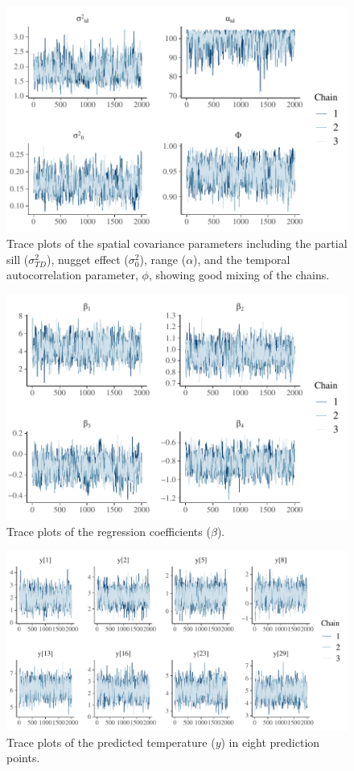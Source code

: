 \begin{figure}[htbp]
  \centering
   \includegraphics[width=5.0in]{./Figs/9traceplot_pars.pdf}
  \caption{Trace plots of the spatial covariance parameters including the partial sill ($\sigma^2_{TD}$), nugget effect ($\sigma^2_{0}$), range ($\alpha$), and the temporal autocorrelation parameter, $\phi$, showing good mixing of the chains. }
  \label{figure:3trace_pars}
\end{figure}



\begin{figure}[htbp]
  \centering
   \includegraphics[width=5.0in]{./Figs/9traceplot_beta.pdf}
  \caption{Trace plots of the regression coefficients ($\beta$). }
  \label{figure:3trace_beta}
\end{figure}


\begin{figure}[htbp]
  \centering
   \includegraphics[width=5.0in]{./Figs/9traceplot_y.pdf}
  \caption{Trace plots of the predicted temperature ($y$) in eight prediction points. }
  \label{figure:3trace_y}
\end{figure}








